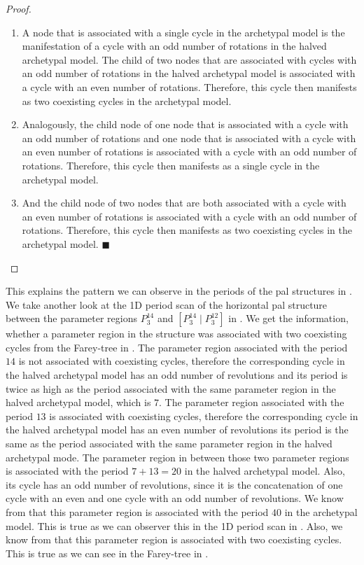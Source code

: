 \begin{proof} \phantom{x}
	\begin{enumerate}
		\item A node that is associated with a single cycle in the archetypal model is the manifestation of a cycle with an odd number of rotations in the halved archetypal model.
		      The child of two nodes that are associated with cycles with an odd number of rotations in the halved archetypal model is associated with a cycle with an even number of rotations.
		      Therefore, this cycle then manifests as two coexisting cycles in the archetypal model.
		\item Analogously, the child node of one node that is associated with a cycle with an odd number of rotations and one node that is associated with a cycle with an even number of rotations is associated with a cycle with an odd number of rotations.
		      Therefore, this cycle then manifests as a single cycle in the archetypal model.
		\item And the child node of two nodes that are both associated with a cycle with an even number of rotations is associated with a cycle with an odd number of rotations.
		      Therefore, this cycle then manifests as two coexisting cycles in the archetypal model.
		      \hfill $\blacksquare$ %
	\end{enumerate}
\end{proof}

This explains the pattern we can observe in the periods of the \gls{pal} structures in .
We take another look at the 1D period scan of the horizontal \gls{pal} structure between the parameter regions $P^{14}_3$ and $\left[P^{14}_3  \mid P^{12}_3\right]$ in .
We get the information, whether a parameter region in the structure was associated with two coexisting cycles from the Farey-tree in .
The parameter region associated with the period $14$ is not associated with coexisting cycles, therefore the corresponding cycle in the halved archetypal model has an odd number of revolutions and its period is twice as high as the period associated with the same parameter region in the halved archetypal model, which is $7$.
The parameter region associated with the period $13$ is associated with coexisting cycles, therefore the corresponding cycle in the halved archetypal model has an even number of revolutions its period is the same as the period associated with the same parameter region in the halved archetypal mode.
The parameter region in between those two parameter regions is associated with the period $7 + 13 = 20$ in the halved archetypal model.
Also, its cycle has an odd number of revolutions, since it is the concatenation of one cycle with an even and one cycle with an odd number of revolutions.
We know from  that this parameter region is associated with the period $40$ in the archetypal model.
This is true as we can observer this in the 1D period scan in .
Also, we know from  that this parameter region is associated with two coexisting cycles.
This is true as we can see in the Farey-tree in .

